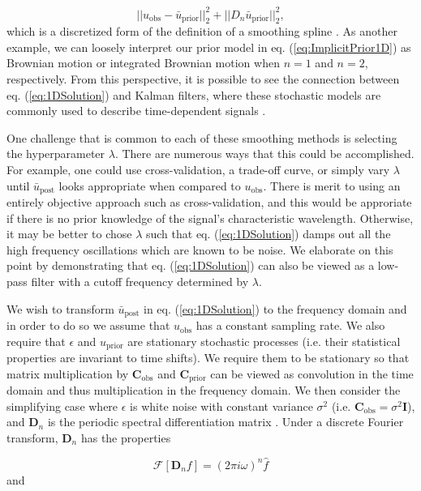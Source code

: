 \documentclass[10pt,a4paper]{article}
\begin{document}
\begin{equation}
||u_\mathrm{obs} - \bar{u}_\mathrm{prior}||_2^2 + ||D_n\bar{u}_\mathrm{prior}||_2^2,
\end{equation}
which is a discretized form of the definition of a smoothing spline \citep[e.g][]{DeBoor1978}.  As another example, we can loosely interpret our prior model in eq. (\ref{eq:ImplicitPrior1D}) as Brownian motion or integrated Brownian motion when $n=1$ and $n=2$, respectively.  From this perspective, it is possible to see the connection between eq. (\ref{eq:1DSolution}) and Kalman filters, where these stochastic models are commonly used to describe time-dependent signals \citep[e.g.][]{Segall1997}.

One challenge that is common to each of these smoothing methods is selecting the hyperparameter $\lambda$.  There are numerous ways that this could be accomplished.  For example, one could use cross-validation, a trade-off curve, or simply vary $\lambda$ until $\bar{u}_\mathrm{post}$ looks appropriate when compared to $u_\mathrm{obs}$.  There is merit to using an entirely objective approach such as cross-validation, and this would be approriate if there is no prior knowledge of the signal's characteristic wavelength.  Otherwise, it may be better to chose $\lambda$ such that eq. (\ref{eq:1DSolution}) damps out all the high frequency oscillations which are known to be noise.  We elaborate on this point by demonstrating that eq. (\ref{eq:1DSolution}) can also be viewed as a low-pass filter with a cutoff frequency determined by $\lambda$.  

We wish to transform $\bar{u}_\mathrm{post}$ in eq. (\ref{eq:1DSolution}) to the frequency domain and in order to do so we assume that $u_\mathrm{obs}$ has a constant sampling rate. We also require that $\epsilon$ and $u_\mathrm{prior}$ are stationary stochastic processes (i.e. their statistical properties are invariant to time shifts).  We require them to be stationary so that matrix multiplication by $\mathbf{C}_\mathrm{obs}$ and $\mathbf{C}_\mathrm{prior}$ can be viewed as convolution in the time domain and thus multiplication in the frequency domain.  We then consider the simplifying case where $\epsilon$ is white noise with constant variance $\sigma^2$ (i.e. $\mathbf{C}_\mathrm{obs} = \sigma^2\mathbf{I}$), and $\mathbf{D}_n$ is the periodic spectral differentiation matrix \citep[e.g.][]{Trefethen2000}.  Under a discrete Fourier transform, $\mathbf{D}_n$ has the properties

\begin{equation}\label{eq:Property1}
  \mathcal{F}[\mathbf{D}_nf] = (2\pi i\omega)^n \hat{f}
\end{equation}
and
\end{document}
